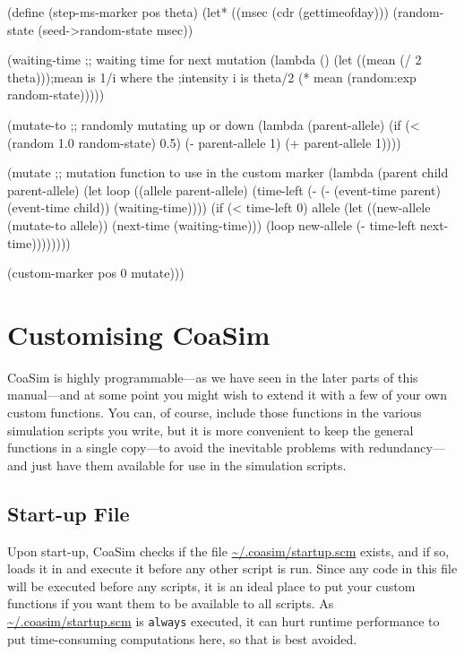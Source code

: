 \documentclass{manual}
\begin{document}
\begin{code}
(define (step-ms-marker pos theta)
  (let* ((msec (cdr (gettimeofday)))
         (random-state (seed->random-state msec))

         (waiting-time
          ;; waiting time for next mutation
          (lambda ()
            (let ((mean (/ 2 theta)));mean is 1/i where the
                                     ;intensity i is theta/2
              (* mean (random:exp random-state)))))

         (mutate-to
          ;; randomly mutating up or down
          (lambda (parent-allele)
            (if (< (random 1.0 random-state) 0.5)
                (- parent-allele 1)
                (+ parent-allele 1))))

         (mutate
          ;; mutation function to use in the custom marker
          (lambda (parent child parent-allele)
            (let loop ((allele parent-allele)
                       (time-left 
                        (- (- (event-time parent) (event-time child))
                           (waiting-time))))
              (if (< time-left 0)
                  allele
                  (let ((new-allele (mutate-to allele))
                        (next-time (waiting-time)))
                    (loop new-allele (- time-left next-time))))))))

    (custom-marker pos 0 mutate)))
\end{code}


\section{Customising CoaSim}
\label{sec:customising-coasim}

CoaSim is highly programmable---as we have seen in the later parts of
this manual---and at some point you might wish to extend it with a few
of your own custom functions.  You can, of course, include those
functions in the various simulation scripts you write, but it is more
convenient to keep the general functions in a single copy---to avoid
the inevitable problems with redundancy---and just have them available
for use in the simulation scripts.


\subsection{Start-up File}
\label{sec:start-up-file}

Upon start-up, CoaSim checks if the file \url{~/.coasim/startup.scm}
exists, and if so, loads it in and execute it before any other script
is run.  Since any code in this file will be executed before any
scripts, it is an ideal place to put your custom functions if you want
them to be available to all scripts.  As \url{~/.coasim/startup.scm}
is \texttt{always} executed, it can hurt runtime performance to put
time-consuming computations here, so that is best avoided.
\end{document}
